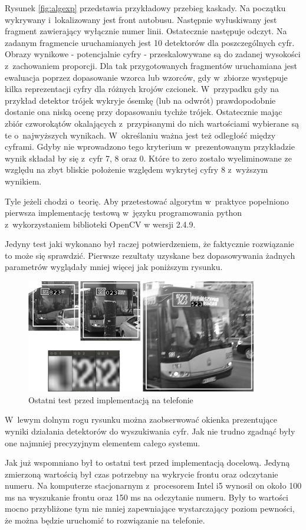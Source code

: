 Rysunek \ref{fig:algexp} przedstawia przykładowy przebieg kaskady. 
Na początku wykrywany i~lokalizowany jest front autobusu.
Następnie wyłuskiwany jest fragment zawierający wyłącznie numer linii.
Ostatecznie następuje odczyt. Na zadanym fragmencie uruchamianych jest
10 detektorów dla poszczególnych cyfr. Obrazy wynikowe - potencjalnie
cyfry - przeskalowywane są do zadanej wysokości z~zachowaniem proporcji.
Dla tak przygotowanych fragmentów uruchamiana jest ewaluacja poprzez
dopasowanie wzorca lub wzorców, gdy w~zbiorze występuje kilka
reprezentacji cyfry dla różnych krojów czcionek. W~przypadku
gdy na przykład detektor trójek
wykryje ósemkę (lub na odwrót) prawdopodobnie dostanie ona niską
ocenę przy dopasowaniu tychże trójek. Ostatecznie mając
zbiór czworokątów okalających z~przypisanymi do nich wartościami
wybierane są te o~najwyższych wynikach. W~określaniu ważna jest też
odległość między cyframi. Gdyby nie wprowadzono tego kryterium
w~prezentowanym przykładzie wynik składał by się z~cyfr 7, 8 oraz 0.
Które to zero zostało wyeliminowane ze względu na zbyt bliskie położenie
względem wykrytej cyfry 8 z~wyższym wynikiem.

Tyle jeżeli chodzi o~teorię. Aby przetestować algorytm w~praktyce
popełniono pierwsza implementację testową w~języku programowania
python z~wykorzystaniem biblioteki OpenCV w wersji 2.4.9.

Jedyny test jaki wykonano był raczej potwierdzeniem, że faktycznie
rozwiązanie to może się sprawdzić. Pierwsze rezultaty uzyskane bez
dopasowywania żadnych parametrów wyglądały mniej więcej jak poniższym 
rysunku.

\begin{figure}[!h]
    \centering
    \includegraphics[width=0.9\textwidth]{img/exp_final_test}
    \caption{Ostatni test przed implementacją na telefonie}
    \label{fig:finaltest}
\end{figure}

W~lewym dolnym rogu rysunku można zaobserwować okienka prezentujące
wyniki działania detektorów do wyszukiwania cyfr. Jak nie trudno
zgadnąć były one najmniej precyzyjnym elementem całego systemu.

Jak już wspomniano był to ostatni test przed implementacją 
docelową. Jedyną zmierzoną wartością był czas potrzebny na wykrycie
frontu oraz odczytanie numeru. Na komputerze stacjonarnym z~procesorem
Intel i5 wynosił on około 100 ms na wyszukanie frontu oraz 150 ms na
odczytanie numeru. Były to wartości mocno przybliżone
tym nie mniej zapewniające wystarczający poziom pewności, że można 
będzie uruchomić to rozwiązanie na telefonie. 
